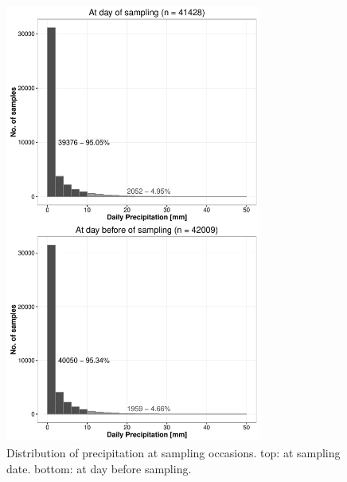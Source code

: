 \documentclass[pdftex,a4paper]{scrreprt}
\begin{document}
\begin{figure}
\centering
\includegraphics[width = 0.75\textwidth]{precip}
\caption{Distribution of precipitation at sampling occasions. top: at sampling date. bottom: at day before sampling.}
\label{fig:precip}
\end{figure}




\end{document}
